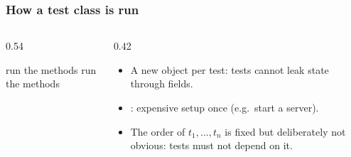 \documentclass[aspectratio=169,10pt,compress]{beamer}
\begin{document}
\begin{frame}[t,fragile] \frametitle{How a test class is run}
  \begin{columns}[T]
    \begin{column}{0.54\textwidth}
      \SetAlFnt{\small}


\begin{algorithm}[H]
  \caption{Running one test class (Jupiter)}
  run the  methods\;
  run the  methods\;
\end{algorithm}

    \end{column}
    \begin{column}{0.42\textwidth}
      \begin{itemize}\small
        \item A new object per test: tests cannot leak state through fields.
        \item {}: expensive setup once (e.g.\ start a server).
        \item The order of $t_{1}, \dots, t_{n}$ is fixed but deliberately not obvious: tests must not depend on it.
      \end{itemize}
    \end{column}
  \end{columns}
\end{frame}

\end{document}
